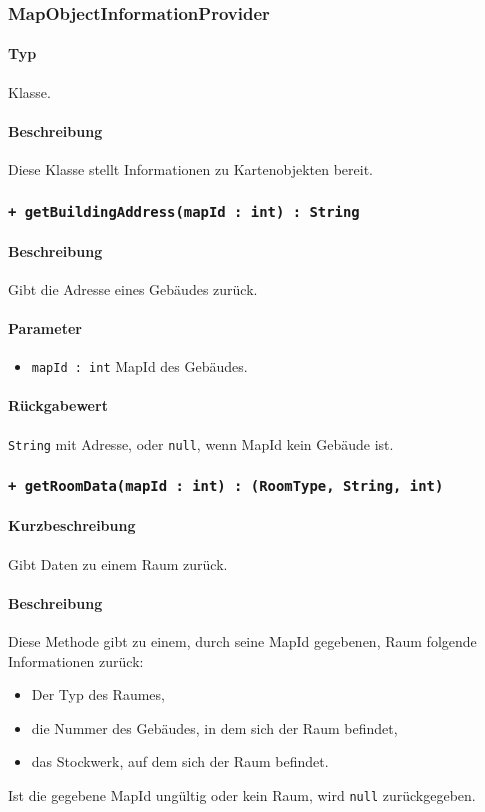 \subsubsection{MapObjectInformationProvider}\label{App_Map_Model_MapObjectInformationProvider}
\paragraph*{Typ}
Klasse.
\paragraph*{Beschreibung}
Diese Klasse stellt Informationen zu Kartenobjekten bereit.

\subsubsection*{\texttt{+ getBuildingAddress(mapId : int) : String}}\label{App_Map_Model_getBuildingAddress_Map}%
\paragraph*{Beschreibung}
Gibt die Adresse eines Gebäudes zurück.
\paragraph*{Parameter}
\begin{itemize}
    \item \texttt{mapId : int} MapId des Gebäudes.
\end{itemize}
\paragraph*{Rückgabewert}
\texttt{String} mit Adresse, oder \texttt{null}, wenn MapId kein Gebäude ist.

\subsubsection*{\texttt{+ getRoomData(mapId : int) : (RoomType, String, int)}}\label{App_Map_Model_getRoomData_Map}%
\paragraph*{Kurzbeschreibung}
Gibt Daten zu einem Raum zurück.
\paragraph*{Beschreibung}
Diese Methode gibt zu einem, durch seine MapId gegebenen, Raum folgende Informationen zurück:
\begin{itemize}
    \item Der Typ des Raumes,
    \item die Nummer des Gebäudes, in dem sich der Raum befindet,
    \item das Stockwerk, auf dem sich der Raum befindet.
\end{itemize}
Ist die gegebene MapId ungültig oder kein Raum, wird \texttt{null} zurückgegeben.
